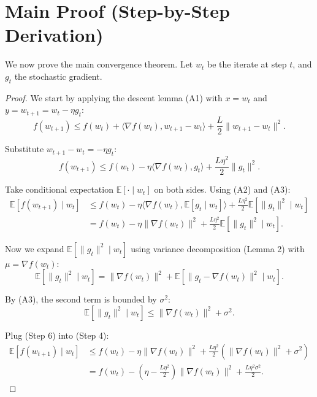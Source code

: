 \documentclass{article}
\begin{document}
\section*{Main Proof (Step-by-Step Derivation)}
We now prove the main convergence theorem. Let $w_t$ be the iterate at step $t$, and $g_t$ the stochastic gradient.

\begin{proof}
We start by applying the descent lemma (A1) with $x = w_t$ and $y = w_{t+1} = w_t - \eta g_t$:
\begin{equation}
    f(w_{t+1}) \leq f(w_t) + \langle \nabla f(w_t), w_{t+1} - w_t \rangle + \frac{L}{2} \|w_{t+1} - w_t\|^2. \tag{Step 1}
\end{equation}

Substitute $w_{t+1} - w_t = -\eta g_t$:
\begin{equation}
    f(w_{t+1}) \leq f(w_t) - \eta \langle \nabla f(w_t), g_t \rangle + \frac{L \eta^2}{2} \|g_t\|^2. \tag{Step 2}
\end{equation}

Take conditional expectation $\mathbb{E}[\cdot \mid w_t]$ on both sides. Using (A2) and (A3):
\begin{align}
    \mathbb{E}[f(w_{t+1}) \mid w_t] &\leq f(w_t) - \eta \langle \nabla f(w_t), \mathbb{E}[g_t \mid w_t] \rangle + \frac{L \eta^2}{2} \mathbb{E}[\|g_t\|^2 \mid w_t] \tag{Step 3} \\
    &= f(w_t) - \eta \|\nabla f(w_t)\|^2 + \frac{L \eta^2}{2} \mathbb{E}[\|g_t\|^2 \mid w_t]. \tag{Step 4}
\end{align}

Now we expand $\mathbb{E}[\|g_t\|^2 \mid w_t]$ using variance decomposition (Lemma 2) with $\mu = \nabla f(w_t)$:
\begin{equation}
    \mathbb{E}[\|g_t\|^2 \mid w_t] = \|\nabla f(w_t)\|^2 + \mathbb{E}[\|g_t - \nabla f(w_t)\|^2 \mid w_t]. \tag{Step 5}
\end{equation}

By (A3), the second term is bounded by $\sigma^2$:
\begin{equation}
    \mathbb{E}[\|g_t\|^2 \mid w_t] \leq \|\nabla f(w_t)\|^2 + \sigma^2. \tag{Step 6}
\end{equation}

Plug (Step 6) into (Step 4):
\begin{align}
    \mathbb{E}[f(w_{t+1}) \mid w_t] &\leq f(w_t) - \eta \|\nabla f(w_t)\|^2 + \frac{L \eta^2}{2} \left( \|\nabla f(w_t)\|^2 + \sigma^2 \right) \tag{Step 7} \\
    &= f(w_t) - \left( \eta - \frac{L \eta^2}{2} \right) \|\nabla f(w_t)\|^2 + \frac{L \eta^2 \sigma^2}{2}. \tag{Step 8}
\end{align}


\end{proof}
\end{document}
